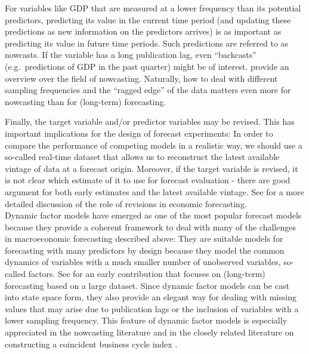 For variables like GDP that are measured at a lower frequency than its potential predictors, predicting its value in the current time period (and updating these predictions as new information on the predictors arrives) is as important as predicting its value in future time periods. Such predictions are referred to as nowcasts. If the variable has a long publication lag, even ``backcasts'' (e.g.~predictions of GDP in the past quarter) might be of interest. \citet{BanburaEtal2013} provide an overview over the field of nowcasting. Naturally, how to deal with different sampling frequencies and the ``ragged edge'' of the data matters even more for nowcasting than for (long-term) forecasting.

Finally, the target variable and/or predictor variables may be revised. This has important implications for the design of forecast experiments: In order to compare the performance of competing models in a realistic way, we should use a so-called real-time dataset that allows us to reconstruct the latest available vintage of data at a forecast origin. Moreover, if the target variable is revised, it is not clear which estimate of it to use for forecast evaluation - there are good argument for both early estimates and the latest available vintage. See \citet{Croushore2011} for a more detailed discussion of the role of revisions in economic forecasting.\\


Dynamic factor models have emerged as one of the most popular forecast models because they provide a coherent framework to deal with many of the challenges in macroeconomic forecasting described above: They are suitable models for forecasting with many predictors by design because they model the common dynamics of variables with a much smaller number of unobserved variables, so-called factors. See \citet{StockWatson2002} for an early contribution that focuses on (long-term) forecasting based on a large dataset. Since dynamic factor models can be cast into state space form, they also provide an elegant way for dealing with missing values that may arise due to publication lags or the inclusion of variables with a lower sampling frequency. This feature of dynamic factor models is especially appreciated in the nowcasting literature \citep{GiannoneEtal2008, BanburaEtal2013} and in the closely related literature on constructing a coincident business cycle index \citep{MarianoMurasawa2003}.

